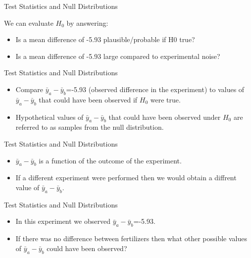 \documentclass[10pt,ignorenonframetext,]{beamer}
\providecommand{\tightlist}{%
\setlength{\itemsep}{0pt}\setlength{\parskip}{0pt}}
\begin{document}
\begin{frame}{Test Statistics and Null Distributions}

We can evaluate \(H_0\) by answering:

\begin{itemize}
\item
  Is a mean difference of -5.93 plausible/probable if H0 true?
\item
  Is a mean difference of -5.93 large compared to experimental noise?
\end{itemize}

\end{frame}

\begin{frame}{Test Statistics and Null Distributions}

\begin{itemize}
\item
  Compare \({\bar y}_a-{\bar y}_b\)=-5.93 (observed difference in the
  experiment) to values of \({\bar y}_a-{\bar y}_b\) that could have
  been observed if \(H_0\) were true.
\item
  Hypothetical values of \({\bar y}_a-{\bar y}_b\) that could have been
  observed under \(H_0\) are referred to as samples from the null
  distribution.
\end{itemize}

\end{frame}

\begin{frame}{Test Statistics and Null Distributions}

\begin{itemize}
\item
  \({\bar y}_a-{\bar y}_b\) is a function of the outcome of the
  experiment.
\item
  If a different experiment were performed then we would obtain a
  diffrent value of \({\bar y}_a-{\bar y}_b\).
\end{itemize}

\end{frame}

\begin{frame}{Test Statistics and Null Distributions}

\begin{itemize}
\tightlist
\item
  In this experiment we observed \({\bar y}_a-{\bar y}_b\)=-5.93.
\item
  If there was no difference between fertilizers then what other
  possible values of \({\bar y}_a-{\bar y}_b\) could have been observed?
\end{itemize}

\end{frame}
\end{document}
